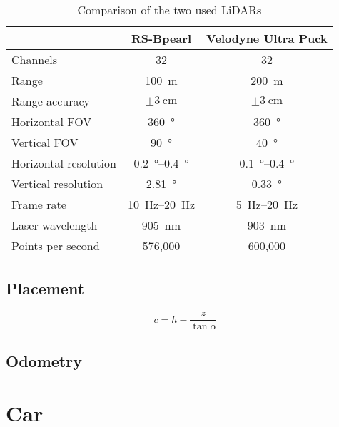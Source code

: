 \begin{table}[ht]
	\centering
	\caption{Comparison of the two used LiDARs \cite{RoboSense2020}\cite{Rev}}
	\label{tab:lidar_datasheets}
	\begin{tabular}[t]{lcc}
	\toprule
	&\textbf{RS-Bpearl} & \textbf{Velodyne Ultra Puck}\\
	\midrule
	Channels 				& 32 							& 32\\
	Range 					& \SI{100}{\metre}				& \SI{200}{\metre}\\
	Range accuracy			& $\pm\SI{3}{\centi\metre}$		& $\pm\SI{3}{\centi\metre}$\\
	Horizontal FOV		 	& \SI{360}{\degree}				& \SI{360}{\degree}\\
	Vertical FOV 			& \SI{90}{\degree}				& \SI{40}{\degree}\\
	Horizontal resolution	& \SIrange{0.2}{0.4}{\degree} 	& \SIrange{0.1}{0.4}{\degree}\\
	Vertical resolution		& \SI{2.81}{\degree} 			& \SI{0.33}{\degree}\\
	Frame rate 				& \SIrange{10}{20}{\hertz}		& \SIrange{5}{20}{\hertz}\\
	Laser wavelength 		& \SI{905}{\nano\metre} 		& \SI{903}{\nano\metre}\\
	Points per second 		& 576,000						& 600,000		\\
	\bottomrule
	\end{tabular}
	\end{table}%


\subsection{Placement}
\[ c = h - \frac{z}{\tan \alpha} \]

\subsection{Odometry}

\section{Car}

